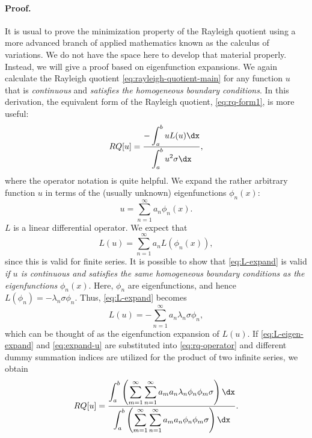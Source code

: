 \paragraph{Proof.}
It is usual to prove the minimization property of the Rayleigh quotient using a more advanced branch of applied mathematics known as the calculus of variations.  We do not have the space here to develop that material properly.  Instead, we will give a proof based on eigenfunction expansions.  We again calculate the Rayleigh quotient \eqref{eq:rayleigh-quotient-main} for any function $u$ that is \textit{continuous} and \textit{satisfies the homogeneous boundary conditions}.  In this derivation, the equivalent form of the Rayleigh quotient, \eqref{eq:rq-form1}, is more useful:
\begin{equation}
\label{eq:rq-operator}
RQ[u] = \frac{\displaystyle -\int_a^b uL(u)\dx}{\displaystyle\int_a^b u^2\sigma\dx},
\end{equation}
where the operator notation is quite helpful.  We expand the rather arbitrary function $u$ in terms of the (usually unknown) eigenfunctions $\phi_n(x)$:
\begin{equation}
\label{eq:expand-u}
u = \sum_{n=1}^{\infty} a_n\phi_n(x).
\end{equation}
$L$ is a linear differential operator.  We expect that
\begin{equation}
\label{eq:L-expand}
L(u) = \sum_{n=1}^{\infty} a_n L(\phi_n(x)),
\end{equation}
since this is valid for finite series.  It is possible to show that \eqref{eq:L-expand} is valid \textit{if $u$ is continuous and satisfies the same homogeneous boundary conditions as the eigenfunctions} $\phi_n(x)$.  Here, $\phi_n$ are eigenfunctions, and hence $L(\phi_n) = -\lambda_n\sigma\phi_n$.  Thus, \eqref{eq:L-expand} becomes
\begin{equation}
\label{eq:L-eigen-expand}
L(u) = -\sum_{n=1}^{\infty} a_n\lambda_n\sigma\phi_n,
\end{equation}
which can be thought of as the eigenfunction expansion of $L(u)$.  If \eqref{eq:L-eigen-expand} and \eqref{eq:expand-u} are substituted into \eqref{eq:rq-operator} and different dummy summation indices are utilized for the product of two infinite series, we obtain
\begin{equation}
\label{eq:rq-double-sum}
RQ[u] = \frac{\displaystyle\int_a^b \left(\sum_{m=1}^{\infty}\sum_{n=1}^{\infty} a_m a_n\lambda_n\phi_n\phi_m\sigma\right)\dx}{\displaystyle\int_a^b \left(\sum_{m=1}^{\infty}\sum_{n=1}^{\infty} a_m a_n\phi_n\phi_m\sigma\right)\dx}.
\end{equation}
